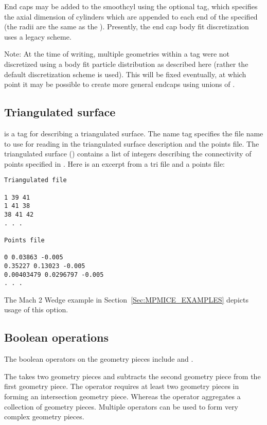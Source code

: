 End caps may be added to the smoothcyl using the optional  tag, which specifies the axial
dimension of cylinders which are appended to each end of the specified
 (the radii are the same as the 
).  Presently, the end cap body fit discretization uses a
legacy scheme.

Note: At the time of writing, multiple 
geometries within a  tag were not
discretized using a body fit particle distribution as described here
(rather the default discretization scheme is used).  This will be
fixed eventually, at which point it may be possible to create more
general endcaps using unions of .

\subsection{Triangulated surface}
 is a tag for describing a triangulated surface.
The name tag specifies the file name to use for reading in the
triangulated surface description and the points file.  The
triangulated surface () contains a list of integers
describing the connectivity of points specified in .
Here is an excerpt from a tri file and a points file:

\begin{lstlisting}[backgroundcolor=\color{background}]
Triangulated file

1 39 41
1 41 38
38 41 42
. . .

Points file

0 0.03863 -0.005
0.35227 0.13023 -0.005
0.00403479 0.0296797 -0.005
. . .
\end{lstlisting}
The Mach 2 Wedge example in Section~\ref{Sec:MPMICE_EXAMPLES} depicts usage of
this option.

\subsection{Boolean operations}
The boolean operators on the geometry pieces include  and .

The  takes two geometry pieces and subtracts
the second geometry piece from the first geometry piece.  The  operator requires at least two geometry
pieces in forming an intersection geometry piece.  Whereas the  operator aggregates a collection of geometry pieces.
Multiple operators can be used to form very complex geometry pieces.

